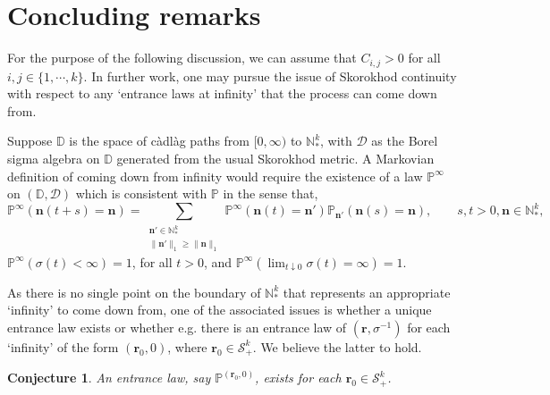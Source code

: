 \documentclass[12pt, leqno]{article}
\newtheorem{conjecture}{Conjecture}
\renewcommand{\eqref}[1]{\hyperref[#1]{(\ref*{#1})}}
\newcommand*{\norm}[1]{\lVert #1 \rVert}
\newcommand{\dd}{{\mathrm d}}
\begin{document}
%
%

\section{Concluding remarks}\label{remarks}

For the purpose of the following discussion, we can assume that $C_{i,j}>0$ for all $i,j\in\{1,\cdots,k\}$.  
In further work, one may pursue the issue of Skorokhod continuity with respect to any  `entrance laws at infinity' that the process can come down from.

\medskip
Suppose  $\mathbb{D}$ is the space of   c\`adl\`ag paths from $[0,\infty)$ to $\mathbb{N}^k_*$, with  $\mathcal{D}$ as the Borel sigma algebra on $\mathbb{D}$ generated from the usual Skorokhod metric. 
A Markovian definition of coming down from infinity would require the existence of a
law  $\mathbb{P}^\infty$ on $(\mathbb{D}, \mathcal{D})$
which is consistent with $\mathbb{P}$ in the sense that, 
\[
\mathbb{P}^\infty(\bm n(t+s) = \bm n)
= \sum_{\substack{\bm n'\in \mathbb{N}^k_*\\ \norm{\bm n'}_1\geq \norm{\bm n}_1}} \mathbb{P}^\infty(\bm n(t) = \bm n') \mathbb{P}_{\bm n'}(\bm n(s) = \bm n)
, \qquad s, t>0, \bm n\in \mathbb{N}^k_*,
\]
 $\mathbb{P}^\infty(\sigma(t)<\infty)=1$, for all $t>0$, and $\mathbb{P}^\infty(\lim_{t\downarrow0}\sigma(t) = \infty)=1$.
 
 \medskip
 
As there is no single point on the boundary of $\mathbb{N}^k_*$ that represents an appropriate `infinity' to come down from,
one of the  associated issues is whether a unique entrance law exists or whether e.g. there is an entrance law of $( \bm r, \sigma^{-1})$ for each `infinity'  of  the form $(\bm r_0, 0)$, where $\bm r_0\in\mathcal{S}^k_+$. We believe the latter to hold.
\begin{conjecture}\label{conj0} An entrance law, say  $\mathbb{P}^{(\bm r_0, 0)}$, exists for each  $\bm{r}_0\in\mathcal{S}^k_+$. 
\end{conjecture}
\end{document}
